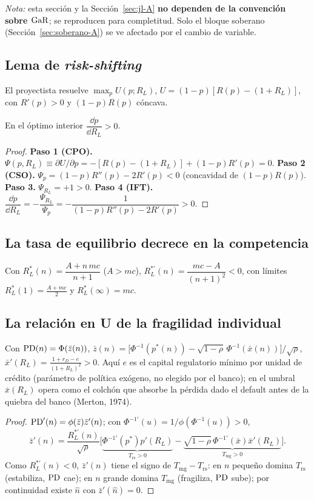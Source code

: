 \emph{Nota:} esta sección y la Sección~\ref{sec:jl-A} \textbf{no dependen de la convención sobre $\mathrm{GaR}$}; se reproducen para completitud. Solo el bloque soberano (Sección~\ref{sec:soberano-A}) se ve afectado por el cambio de variable.

\subsection{Lema de \textit{risk-shifting}}\label{sec:rs-A}
El proyectista resuelve $\max_p U(p;R_L)$, $U=(1-p)[R(p)-(1+R_L)]$, con $R'(p)>0$ y $(1-p)R(p)$ cóncava.
\begin{lemma}\label{lem:rs-A}
En el óptimo interior $\dfrac{\dd p}{\dd R_L}>0$.
\end{lemma}
\begin{proof}
\textbf{Paso 1 (CPO).} $\Psi(p,R_L)\equiv\partial U/\partial p=-[R(p)-(1+R_L)]+(1-p)R'(p)=0.$
\textbf{Paso 2 (CSO).} $\Psi_p=(1-p)R''(p)-2R'(p)<0$ (concavidad de $(1-p)R(p)$).
\textbf{Paso 3.} $\Psi_{R_L}=+1>0.$
\textbf{Paso 4 (IFT).} $\dfrac{\dd p}{\dd R_L}=-\dfrac{\Psi_{R_L}}{\Psi_p}=-\dfrac{1}{(1-p)R''(p)-2R'(p)}>0.$
\end{proof}

\subsection{La tasa de equilibrio decrece en la competencia}
\begin{lemma}\label{lem:RL-A}
Con $R_L^*(n)=\dfrac{A+n\,mc}{n+1}$ ($A>mc$), $R_L^{*\prime}(n)=\dfrac{mc-A}{(n+1)^2}<0$, con límites $R_L^*(1)=\frac{A+mc}{2}$ y $R_L^*(\infty)=mc$.
\end{lemma}

\subsection{La relación en U de la fragilidad individual}
Con $\mathrm{PD}(n)=\Phi(\bar z(n))$, $\bar z(n)=\big[\Phi^{-1}(p^*(n))-\sqrt{1-\rho}\,\Phi^{-1}(\bar x(n))\big]/\sqrt{\rho}$, $\bar x'(R_L)=\frac{1+r_D-e}{(1+R_L)^2}>0$. Aquí $e$ es el capital regulatorio mínimo por unidad de crédito (parámetro de política exógeno, no elegido por el banco); en el umbral $\bar x(R_L)$ opera como el colchón que absorbe la pérdida dado el default antes de la quiebra del banco (Merton, 1974).
\begin{proof}
$\mathrm{PD}'(n)=\phi(\bar z)\bar z'(n)$; con $\Phi^{-1\prime}(u)=1/\phi(\Phi^{-1}(u))>0$,
\[
\bar z'(n)=\frac{R_L^{*\prime}(n)}{\sqrt\rho}\big[\underbrace{\Phi^{-1\prime}(p^*)p'(R_L)}_{T_{\text{rs}}>0}-\underbrace{\sqrt{1-\rho}\,\Phi^{-1\prime}(\bar x)\bar x'(R_L)}_{T_{\text{mg}}>0}\big].
\]
Como $R_L^{*\prime}(n)<0$, $\bar z'(n)$ tiene el signo de $T_{\text{mg}}-T_{\text{rs}}$: en $n$ pequeño domina $T_{\text{rs}}$ (estabiliza, $\mathrm{PD}$ cae); en $n$ grande domina $T_{\text{mg}}$ (fragiliza, $\mathrm{PD}$ sube); por continuidad existe $\hat n$ con $\bar z'(\hat n)=0$.
\end{proof}

